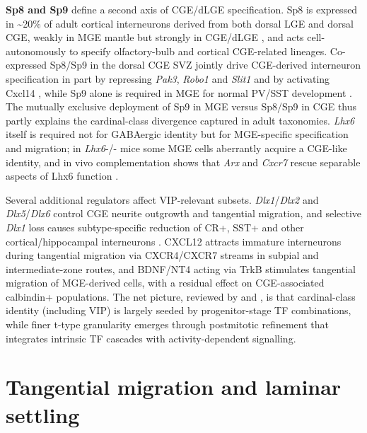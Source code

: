 \documentclass[11pt]{article}
\begin{document}
\textbf{Sp8 and Sp9} define a second axis of CGE/dLGE specification. Sp8 is expressed in {\textasciitilde}20\% of adult cortical interneurons derived from both dorsal LGE and dorsal CGE, weakly in MGE mantle but strongly in CGE/dLGE \citep{Tao2019}, and acts cell-autonomously to specify olfactory-bulb and cortical CGE-related lineages. Co-expressed Sp8/Sp9 in the dorsal CGE SVZ jointly drive CGE-derived interneuron specification in part by repressing \textit{Pak3}, \textit{Robo1} and \textit{Slit1} and by activating Cxcl14 \citep{Wei2019}, while Sp9 alone is required in MGE for normal PV/SST development \citep{Liu2019b}. The mutually exclusive deployment of Sp9 in MGE versus Sp8/Sp9 in CGE thus partly explains the cardinal-class divergence captured in adult taxonomies. \textit{Lhx6} itself is required not for GABAergic identity but for MGE-specific specification and migration; in \textit{Lhx6}-/- mice some MGE cells aberrantly acquire a CGE-like identity, and in vivo complementation shows that \textit{Arx} and \textit{Cxcr7} rescue separable aspects of Lhx6 function \citep{Alifragis2004, Zhao2008}.

Several additional regulators affect VIP-relevant subsets. \textit{Dlx1}/\textit{Dlx2} and \textit{Dlx5}/\textit{Dlx6} control CGE neurite outgrowth and tangential migration, and selective \textit{Dlx1} loss causes subtype-specific reduction of CR+, SST+ and other cortical/hippocampal interneurons \citep{Cobos2007, Wang2010, Cobos2005}. CXCL12 attracts immature interneurons during tangential migration via CXCR4/CXCR7 streams in subpial and intermediate-zone routes, and BDNF/NT4 acting via TrkB stimulates tangential migration of MGE-derived cells, with a residual effect on CGE-associated calbindin+ populations. The net picture, reviewed by \citet{Lim2018} and \citet{Demarcogarcia2025}, is that cardinal-class identity (including VIP) is largely seeded by progenitor-stage TF combinations, while finer t-type granularity emerges through postmitotic refinement that integrates intrinsic TF cascades with activity-dependent signalling.

\section{Tangential migration and laminar settling}
\end{document}
